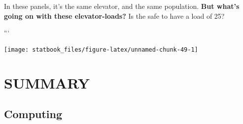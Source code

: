 \documentclass[]{book}
\begin{document}
In these panels, it's the same elevator, and the same population. \textbf{But what's going on with these elevator-loads?} Is the safe to have a load of 25?

```

\begin{center}\texttt{[image: statbook\_files/figure-latex/unnamed-chunk-49-1]} \end{center}

\hypertarget{summary-3}{%
\section{SUMMARY}\label{summary-3}}

\hypertarget{computing-1}{%
\subsection{Computing}\label{computing-1}}
\end{document}
